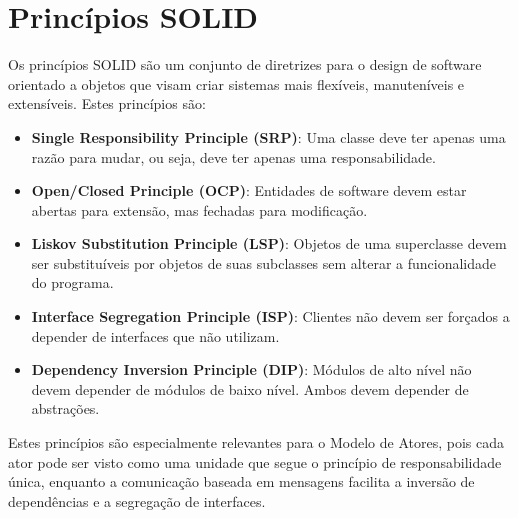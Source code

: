 \section{Princípios SOLID}

Os princípios SOLID são um conjunto de diretrizes para o design de software orientado a objetos que visam criar sistemas mais flexíveis, manuteníveis e extensíveis. Estes princípios são:

\begin{itemize}
    \item \textbf{Single Responsibility Principle (SRP)}: Uma classe deve ter apenas uma razão para mudar, ou seja, deve ter apenas uma responsabilidade.
    
    \item \textbf{Open/Closed Principle (OCP)}: Entidades de software devem estar abertas para extensão, mas fechadas para modificação.
    
    \item \textbf{Liskov Substitution Principle (LSP)}: Objetos de uma superclasse devem ser substituíveis por objetos de suas subclasses sem alterar a funcionalidade do programa.
    
    \item \textbf{Interface Segregation Principle (ISP)}: Clientes não devem ser forçados a depender de interfaces que não utilizam.
    
    \item \textbf{Dependency Inversion Principle (DIP)}: Módulos de alto nível não devem depender de módulos de baixo nível. Ambos devem depender de abstrações.
\end{itemize}

Estes princípios são especialmente relevantes para o Modelo de Atores, pois cada ator pode ser visto como uma unidade que segue o princípio de responsabilidade única, enquanto a comunicação baseada em mensagens facilita a inversão de dependências e a segregação de interfaces.

